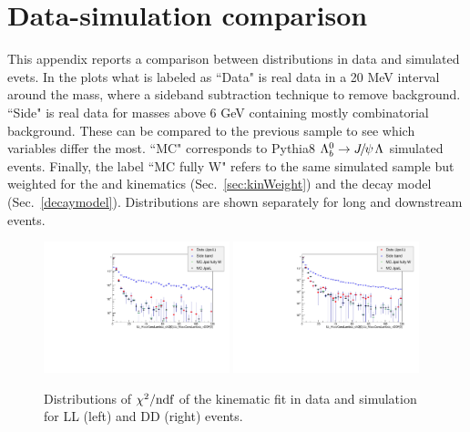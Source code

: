 \chapter{Data-simulation comparison}
\label{app:MC_data_comp}

This appendix reports a comparison between distributions in data and simulated \Lb\to\jpsi\Lz evets.
%
In the plots what is labeled as ``Data" is real data in a 20 MeV interval around the \Lb mass,
where a sideband subtraction technique to remove background. ``Side" is real data for masses
above 6 GeV containing mostly combinatorial background. These can be compared to the previous
sample to see which variables differ the most.
``MC" corresponds to Pythia8 $\Lb\to\jpsi\Lz$ simulated events. %
Finally, the label ``MC fully W" refers to the same simulated sample but weighted for the
\Lb and \Lz kinematics (Sec.~\ref{sec:kinWeight}) and the decay model (Sec.~\ref{decaymodel}).
Distributions are shown separately for long and downstream events.


\begin{figure}[h!]
\centering
\includegraphics[width=0.48\textwidth]{Lmumu/figs/MC_data_comp/Lb_MassConsLambda_chi20Lb_MassConsLambda_nDOF0_plotLL.pdf}
\includegraphics[width=0.48\textwidth]{Lmumu/figs/MC_data_comp/Lb_MassConsLambda_chi20Lb_MassConsLambda_nDOF0_plotDD.pdf}
\caption{ Distributions of $\chi^2/\text{ndf}$ of the kinematic fit in data and simulation for LL (left) and DD (right) events.   }
\end{figure}


